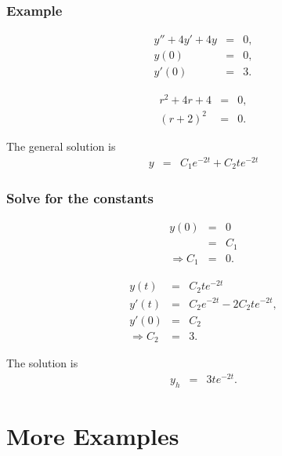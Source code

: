 \begin{frame}
  \frametitle{Example}

  \begin{eqnarray*}
    y'' + 4y' + 4y & = & 0, \\
    y(0) & = & 0, \\
    y'(0) & = & 3.
  \end{eqnarray*}

  {
    \begin{eqnarray*}
      r^2 + 4r + 4 & = & 0, \\
      (r+2)^2 & = & 0.
    \end{eqnarray*}

    The general solution is
    \begin{eqnarray*}
      y & = & C_1 e^{-2t} + C_2 t e^{-2t}
    \end{eqnarray*}

  }

\end{frame}



\begin{frame}
  \frametitle{Solve for the constants}

  \begin{eqnarray*}
    y(0) & = & 0 \\
    & = & C_1 \\
    \Rightarrow C_1 & = & 0.
  \end{eqnarray*}

  \begin{eqnarray*}
    y(t) & = & C_2 t e^{-2t} \\
    y'(t) & = & C_2 e^{-2t} - 2 C_2 t e^{-2t}, \\
    y'(0) & = & C_2 \\
    \Rightarrow C_2 & = & 3.
  \end{eqnarray*}

  The solution is
  \begin{eqnarray*}
    y_h & = & 3 t e^{-2t}.
  \end{eqnarray*}

\end{frame}

\section{More Examples}


